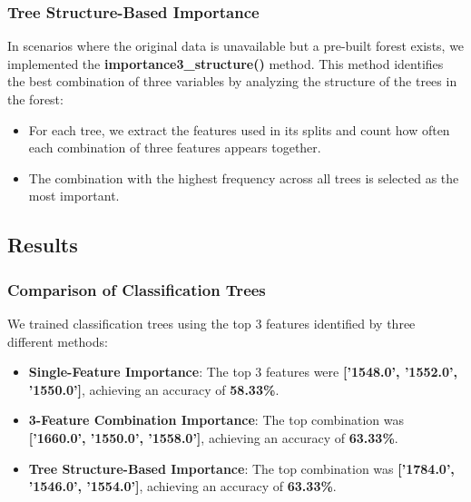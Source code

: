 \documentclass[fleqn,moreauthors,10pt]{ds_report}
\begin{document}
\subsubsection*{Tree Structure-Based Importance}
In scenarios where the original data is unavailable but a pre-built forest exists, we implemented the \textbf{importance3\_structure()} method. This method identifies the best combination of three variables by analyzing the structure of the trees in the forest:
\begin{itemize}
    \item For each tree, we extract the features used in its splits and count how often each combination of three features appears together.
    \item The combination with the highest frequency across all trees is selected as the most important.
\end{itemize}

\subsection*{Results}

\subsubsection*{Comparison of Classification Trees}
We trained classification trees using the top 3 features identified by three different methods:
\begin{itemize}
    \item \textbf{Single-Feature Importance}: The top 3 features were \textbf{['1548.0', '1552.0', '1550.0']}, achieving an accuracy of \textbf{58.33\%}.
    \item \textbf{3-Feature Combination Importance}: The top combination was \textbf{['1660.0', '1550.0', '1558.0']}, achieving an accuracy of \textbf{63.33\%}.
    \item \textbf{Tree Structure-Based Importance}: The top combination was \textbf{['1784.0', '1546.0', '1554.0']}, achieving an accuracy of \textbf{63.33\%}.
\end{itemize}
\end{document}

